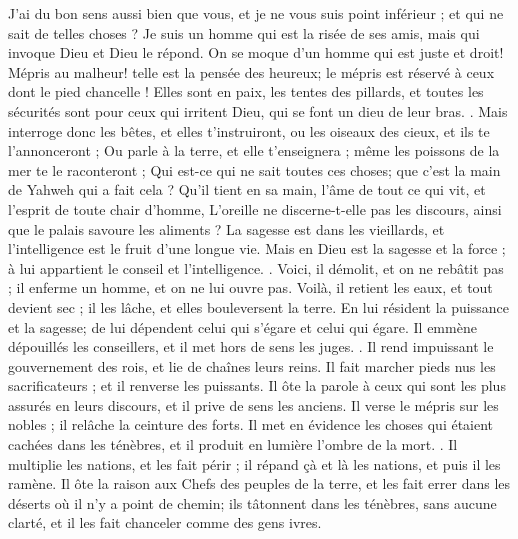 \begin{multicols}{2}
J'ai du bon sens aussi bien que vous, et je ne vous suis point inférieur ; et qui ne sait de telles choses ?
Je suis un homme qui est la risée de ses amis, mais qui invoque Dieu et Dieu le répond. On se moque d'un homme qui est juste et droit!
 Mépris au malheur! telle est la pensée des heureux; le mépris est réservé à ceux dont le pied chancelle !
Elles sont en paix, les tentes des pillards, et toutes les sécurités sont pour ceux qui irritent Dieu, qui se font un dieu de leur bras. .
Mais interroge donc les bêtes, et elles t'instruiront, ou les oiseaux des cieux, et ils te l'annonceront ;
Ou parle à la terre, et elle t'enseignera ; même les poissons de la mer te le raconteront ; 
Qui est-ce qui ne sait toutes ces choses; que c'est la main de Yahweh qui a fait cela ?
 Qu'il tient en sa main, l'âme de tout ce qui vit, et l'esprit de toute chair d'homme,
L'oreille ne discerne-t-elle pas les discours, ainsi que le palais savoure les aliments ?
La sagesse est dans les vieillards, et l'intelligence est le fruit d'une longue vie.
Mais en Dieu est la sagesse et la force ; à lui appartient le conseil et l'intelligence. .
Voici, il démolit, et on ne rebâtit pas ; il enferme un homme, et on ne lui ouvre pas.
Voilà, il retient les eaux, et tout devient sec ; il les lâche, et elles bouleversent la terre.
 En lui résident la puissance et la sagesse; de lui dépendent celui qui s'égare et celui qui égare.
 Il emmène dépouillés les conseillers, et il met hors de sens les juges. .
Il rend impuissant le gouvernement des rois, et lie de chaînes leurs reins. 
Il fait marcher pieds nus les sacrificateurs ; et il renverse les puissants.
Il ôte la parole à ceux qui sont les plus assurés en leurs discours, et il prive de sens les anciens.
Il verse le mépris sur les nobles ; il relâche la ceinture des forts.
Il met en évidence les choses qui étaient cachées dans les ténèbres, et il produit en lumière l'ombre de la mort. .
 Il multiplie les nations, et les fait périr ; il répand çà et là les nations, et puis il les ramène. 
Il ôte la raison aux Chefs des peuples de la terre, et les fait errer dans les déserts où il n'y a point de chemin;
ils tâtonnent dans les ténèbres, sans aucune clarté, et il les fait chanceler comme des gens ivres. 

\end{multicols}

